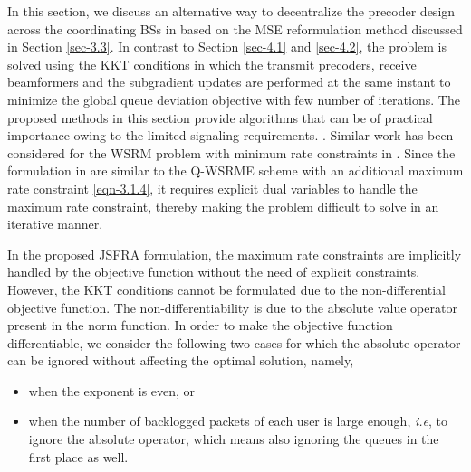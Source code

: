 
In this section, we discuss an alternative way to decentralize the precoder design across the coordinating \acp{BS} in  based on the \ac{MSE} reformulation method discussed in Section \ref{sec-3.3}. In contrast to Section \ref{sec-4.1} and \ref{sec-4.2}, the problem is solved using the \ac{KKT} conditions in which the transmit precoders, receive beamformers and the subgradient updates are performed at the same instant to minimize the global queue deviation objective with few number of iterations. The proposed methods in this section provide algorithms that can be of practical importance owing to the limited signaling requirements. .  Similar work has been considered for the \ac{WSRM} problem with minimum rate constraints in \cite{kaleva2013decentralized,kaleva2013primal}. Since the formulation in \cite{kaleva2013decentralized,kaleva2013primal} are similar to the \ac{Q-WSRME} scheme with an additional maximum rate constraint \eqref{eqn-3.1.4}, it requires explicit dual variables to handle the maximum rate constraint, thereby making the problem difficult to solve in an iterative manner.

In the proposed \ac{JSFRA} formulation, the maximum rate constraints are implicitly handled by the objective function without the need of explicit constraints. However, the \ac{KKT} conditions cannot be formulated due to the non-differential objective function. The non-differentiability is due to the absolute value operator present in the norm function. In order to make the objective function differentiable, we consider the following two cases for which the absolute operator can be ignored without affecting the optimal solution, namely,
\begin{itemize}
\item when the exponent  is even, or
\item when the number of backlogged packets of each user is large enough, \textit{i.e},  to ignore the absolute operator, which means also ignoring the queues in the first place as well.
\end{itemize}


